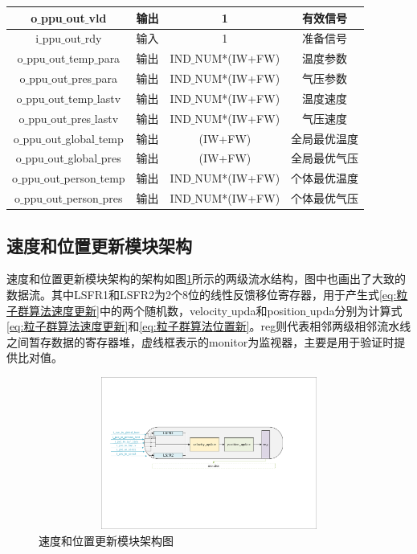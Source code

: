 \begin{table}[htb]
\begin{tabular}{c|c|c|c}
        o$\_$ppu$\_$out$\_$vld                         & 输出      & 1                     & 有效信号        \\ \hline
        i$\_$ppu$\_$out$\_$rdy                         & 输入      & 1                     & 准备信号        \\ \hline
        o$\_$ppu$\_$out$\_$temp$\_$para                & 输出      & IND$\_$NUM*(IW+FW)    & 温度参数        \\ \hline
        o$\_$ppu$\_$out$\_$pres$\_$para                & 输出      & IND$\_$NUM*(IW+FW)    & 气压参数        \\ \hline
        o$\_$ppu$\_$out$\_$temp$\_$lastv               & 输出      & IND$\_$NUM*(IW+FW)    & 温度速度        \\ \hline
        o$\_$ppu$\_$out$\_$pres$\_$lastv               & 输出      & IND$\_$NUM*(IW+FW)    & 气压速度        \\ \hline
        o$\_$ppu$\_$out$\_$global$\_$temp              & 输出      & (IW+FW)               & 全局最优温度        \\ \hline
        o$\_$ppu$\_$out$\_$global$\_$pres              & 输出      & (IW+FW)               & 全局最优气压        \\ \hline
        o$\_$ppu$\_$out$\_$person$\_$temp              & 输出      & IND$\_$NUM*(IW+FW)    & 个体最优温度        \\ \hline
        o$\_$ppu$\_$out$\_$person$\_$pres              & 输出      & IND$\_$NUM*(IW+FW)    & 个体最优气压        \\ \hline
    \end{tabular}
  \end{table}

\subsection{速度和位置更新模块架构}
速度和位置更新模块架构的架构如图\ref{fig:速度和位置更新模块架构图}所示的两级流水结构，图中也画出了大致的数据流。其中LSFR1和LSFR2为2个8位的线性反馈移位寄存器，用于产生式\eqref{eq:粒子群算法速度更新}中的两个随机数，velocity$\_$upda和position$\_$upda分别为计算式\eqref{eq:粒子群算法速度更新}和\eqref{eq:粒子群算法位置新}。reg则代表相邻两级相邻流水线之间暂存数据的寄存器堆，虚线框表示的monitor为监视器，主要是用于验证时提供比对值。
\begin{figure}[htb]
    \centering
    \includegraphics[width=14cm,height=5cm]{fig/5-fig/速度和位置更新模块架构图.pdf}
    \caption{速度和位置更新模块架构图}
    \label{fig:速度和位置更新模块架构图}
\end{figure}

